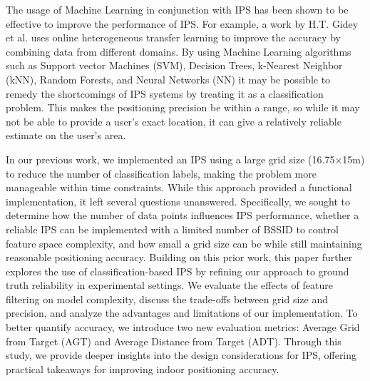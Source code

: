 \documentclass[conference]{IEEEtran}
\begin{document}
	The usage of Machine Learning in conjunction with IPS has been shown to be effective to improve the performance of IPS. For example, a work by H.T. Gidey et al. \cite{bgp3} uses online heterogeneous transfer learning to improve the accuracy by combining data from different domains. By using Machine Learning algorithms such as Support vector Machines (SVM), Decision Trees, k-Nearest Neighbor (kNN), Random Forests, and Neural Networks (NN) it may be possible to remedy the shortcomings of IPS systems by treating it as a classification problem. This makes the positioning precision be within a range, so while it may not be able to provide a user's exact location, it can give a relatively reliable estimate on the user's area.
	
	In our previous work, we implemented an IPS using a large grid size (16.75×15m) to reduce the number of classification labels, making the problem more manageable within time constraints. While this approach provided a functional implementation, it left several questions unanswered. Specifically, we sought to determine how the number of data points influences IPS performance, whether a reliable IPS can be implemented with a limited number of BSSID to control feature space complexity, and how small a grid size can be while still maintaining reasonable positioning accuracy.
	Building on this prior work, this paper further explores the use of classification-based IPS by refining our approach to ground truth reliability in experimental settings. We evaluate the effects of feature filtering on model complexity, discuss the trade-offs between grid size and precision, and analyze the advantages and limitations of our implementation. To better quantify accuracy, we introduce two new evaluation metrics: Average Grid from Target (AGT) and Average Distance from Target (ADT). Through this study, we provide deeper insights into the design considerations for IPS, offering practical takeaways for improving indoor positioning accuracy.
	
	
\end{document}
